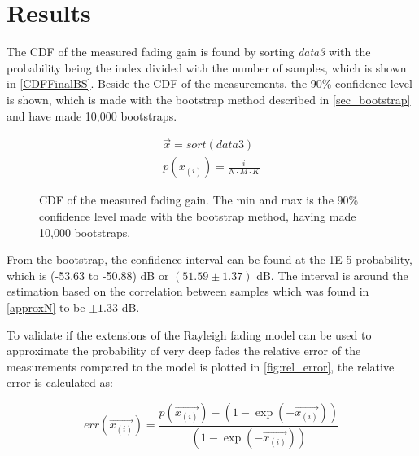 \newpage
\section{Results}

The \gls{CDF} of the measured fading gain is found by sorting \textit{data3} with the probability being the index divided with the number of samples, which is shown in \autoref{CDFFinalBS}. Beside the CDF of the measurements, the 90\% confidence level is shown, which is made with the bootstrap method described in \autoref{sec_bootstrap} and have made 10,000 bootstraps. 

\begin{align}
\overrightarrow{x} = sort(data3)\\
p(x_{(i)}) = \frac{i}{N\cdot M\cdot K} 
\end{align} 
\begin{where}
\end{where}

\begin{figure}[H]
\centering

\caption{CDF of the measured fading gain. The min and max is the 90\% confidence level made with the bootstrap method, having made 10,000 bootstraps.}
\label{CDFFinalBS}
\end{figure}


From the bootstrap, the confidence interval can be found at the 1E-5 probability, which is (-53.63 to -50.88) dB or $(51.59\pm 1.37)$ dB. The interval is around the estimation based on the correlation between samples which was found in \autoref{approxN} to be $\pm 1.33$ dB.


To validate if the extensions of the Rayleigh fading model can be used to approximate the probability of very deep fades the relative error of the measurements compared to the model is plotted in \autoref{fig:rel_error}, the relative error is calculated as:

\begin{equation}
err(\overrightarrow{x_{(i)}}) = \frac{p(\overrightarrow{x_{(i)}})-\left(1-\exp(-\overrightarrow{x_{(i)}})\right)}{(1-\exp(-\overrightarrow{x_{(i)}}))}
\end{equation}
\begin{where}
\end{where}

